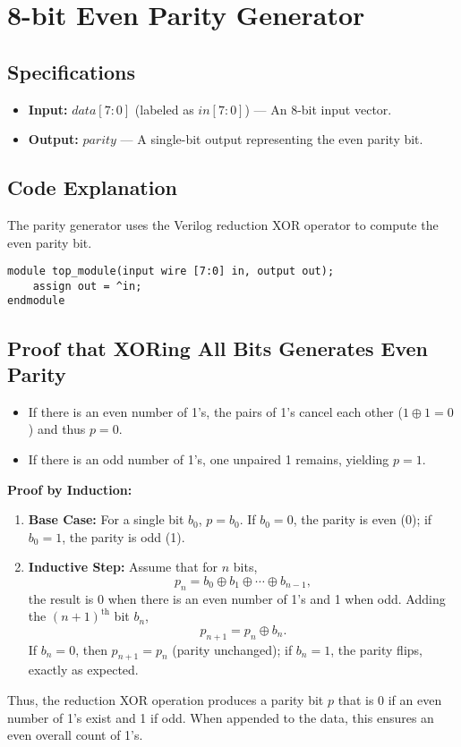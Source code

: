 \documentclass[11pt]{article}
\begin{document}
\section{8-bit Even Parity Generator}

\subsection{Specifications}
\begin{itemize}
    \item \textbf{Input:} \({data[7:0]}\) (labeled as \({in[7:0]}\)) --- An 8-bit input vector.
    \item \textbf{Output:} \({parity}\) --- A single-bit output representing the even parity bit.
\end{itemize}

\subsection{Code Explanation}
The parity generator uses the Verilog reduction XOR operator to compute the even parity bit.

\begin{lstlisting}[style=verilogstyle, caption={8-bit Even Parity Generator}]
module top_module(input wire [7:0] in, output out);
    assign out = ^in;
endmodule
\end{lstlisting}

\subsection{Proof that XORing All Bits Generates Even Parity}
\begin{itemize}
    \item If there is an even number of 1's, the pairs of 1's cancel each other (\(1 \oplus 1 = 0\)) and thus \(p = 0\).
    \item If there is an odd number of 1's, one unpaired 1 remains, yielding \(p = 1\).
\end{itemize}

\textbf{Proof by Induction:}
\begin{enumerate}
    \item \textbf{Base Case:} For a single bit \(b_0\), \(p = b_0\). If \(b_0=0\), the parity is even (0); if \(b_0=1\), the parity is odd (1).
    \item \textbf{Inductive Step:} Assume that for \(n\) bits,
    \[
    p_n = b_0 \oplus b_1 \oplus \cdots \oplus b_{n-1},
    \]
    the result is 0 when there is an even number of 1's and 1 when odd. Adding the \((n+1)^\text{th}\) bit \(b_n\),
    \[
    p_{n+1} = p_n \oplus b_n.
    \]
    If \(b_n=0\), then \(p_{n+1}=p_n\) (parity unchanged); if \(b_n=1\), the parity flips, exactly as expected.
\end{enumerate}
Thus, the reduction XOR operation produces a parity bit \(p\) that is 0 if an even number of 1's exist and 1 if odd. When appended to the data, this ensures an even overall count of 1's.
\end{document}
